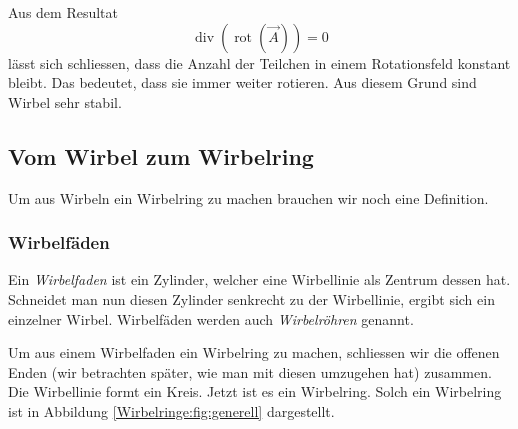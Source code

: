 Aus dem Resultat
\begin{equation}
    \label{Wirbelringe:eq:wIdent}
\operatorname{div} ( \operatorname{rot} ( \vec{A} ) ) 
= 
0
\end{equation}
lässt sich schliessen, dass die Anzahl der Teilchen in einem Rotationsfeld konstant bleibt. 
Das bedeutet, dass sie immer weiter rotieren. 
Aus diesem Grund sind Wirbel sehr stabil.

\subsection{Vom Wirbel zum Wirbelring}

Um aus Wirbeln ein Wirbelring zu machen brauchen wir noch eine Definition.

\subsubsection*{Wirbelfäden}

Ein {\em Wirbelfaden} ist ein Zylinder, welcher eine Wirbellinie als Zentrum dessen hat.
Schneidet man nun diesen Zylinder senkrecht zu der Wirbellinie, ergibt sich ein einzelner Wirbel.
Wirbelfäden werden auch {\em Wirbelröhren} genannt.

Um aus einem Wirbelfaden ein Wirbelring zu machen, schliessen wir die offenen Enden (wir betrachten später, wie man mit diesen umzugehen hat) zusammen.
Die Wirbellinie formt ein Kreis.
Jetzt ist es ein Wirbelring. 
Solch ein Wirbelring ist in Abbildung \ref{Wirbelringe:fig:generell} dargestellt.


